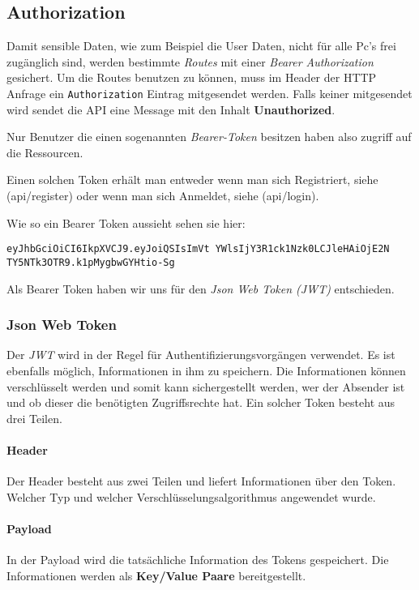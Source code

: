 \subsection{Authorization}

Damit sensible Daten, wie zum Beispiel die User Daten, nicht für
alle Pc's frei zugänglich sind, werden bestimmte \textit{Routes} mit einer
\textit{Bearer Authorization} gesichert. Um die Routes benutzen zu können, muss
im Header der HTTP Anfrage ein \texttt{Authorization} Eintrag mitgesendet werden.
Falls keiner mitgesendet wird sendet die API eine Message mit den Inhalt
\textbf{Unauthorized}.

Nur Benutzer die einen sogenannten \textit{Bearer-Token} besitzen haben also zugriff
auf die Ressourcen.

Einen solchen Token erhält man entweder wenn man sich Registriert, siehe (api/register) oder wenn man sich
Anmeldet, siehe (api/login).

Wie so ein Bearer Token aussieht sehen sie hier:

\texttt{eyJhbGciOiCI6IkpXVCJ9.eyJoiQSIsImVt
    YWlsIjY3R1ck1Nzk0LCJleHAiOjE2N
    TY5NTk3OTR9.k1pMygbwGYHtio-Sg}

Als Bearer Token haben wir uns für den \textit{Json Web Token (JWT)} entschieden.

\pagebreak

\subsubsection{Json Web Token}
\label{token}
Der \textit{JWT} wird in der Regel für Authentifizierungsvorgängen verwendet. Es ist ebenfalls
möglich, Informationen in ihm zu speichern. Die Informationen können verschlüsselt werden
und somit kann sichergestellt werden, wer der Absender ist und ob dieser die benötigten Zugriffsrechte
hat. Ein solcher Token besteht aus drei Teilen.

\paragraph{Header}
Der Header besteht aus zwei Teilen und liefert Informationen über den Token. Welcher Typ und
welcher Verschlüsselungsalgorithmus angewendet wurde.

\paragraph{Payload}
In der Payload wird die tatsächliche Information des Tokens gespeichert. Die Informationen
werden als \textbf{Key/Value Paare} bereitgestellt.

